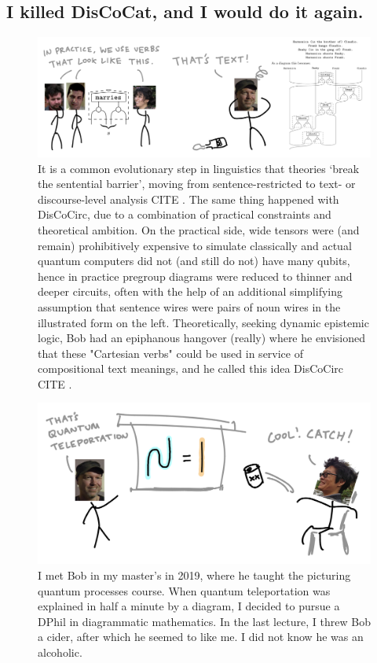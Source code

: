 \subsection{I killed DisCoCat, and I would do it again.}

\begin{figure}[h!]
\includegraphics{figures/cartoons/discocirc1}
\caption{It is a common evolutionary step in linguistics that theories `break the sentential barrier', moving from sentence-restricted to text- or discourse-level analysis \bR CITE \e. The same thing happened with DisCoCirc, due to a combination of practical constraints and theoretical ambition. On the practical side, wide tensors were (and remain) prohibitively expensive to simulate classically and actual quantum computers did not (and still do not) have many qubits, hence in practice pregroup diagrams were reduced to thinner and deeper circuits, often with the help of an additional simplifying assumption that sentence wires were pairs of noun wires in the illustrated form on the left. Theoretically, seeking dynamic epistemic logic, Bob had an epiphanous hangover (really) where he envisioned that these "Cartesian verbs" could be used in service of compositional text meanings, and he called this idea DisCoCirc \bR CITE \e.}
\end{figure}

\begin{figure}[h!]
\includegraphics{figures/cartoons/v1}
\caption{I met Bob in my master's in 2019, where he taught the picturing quantum processes course. When quantum teleportation was explained in half a minute by a diagram, I decided to pursue a DPhil in diagrammatic mathematics. In the last lecture, I threw Bob a cider, after which he seemed to like me. I did not know he was an alcoholic.}
\end{figure}
\clearpage

